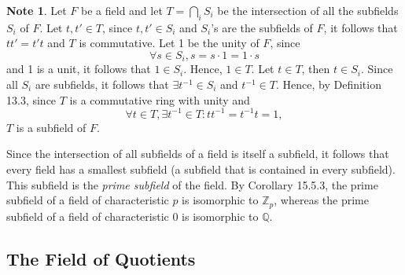 \documentclass{article}
\newtheorem{theorem}{Theorem}[section]
\theoremstyle{definition}
\newtheorem{note}{Note}[section]
\begin{document}
\begin{note}
    Let $F$ be a field and let $T=\bigcap_i S_i$ be the intersection of all the subfields $S_i$ of $F$. Let $t,t'\in T$, since $t,t'\in S_i$ and $S_i$'s are the subfields of $F$, it follows that $tt'=t't$ and $T$ is commutative. Let 1 be the unity of $F$, since
    \begin{equation*}
        \forall s \in S_i, s=s\cdot1=1\cdot s
    \end{equation*}
    and 1 is a unit, it follows that $1\in S_i$. Hence, $1\in T$. Let $t\in T$, then $t\in S_i$. Since all $S_i$ are subfields, it follows that $\exists t^{-1}\in S_i$ and $t^{-1}\in T$. Hence, by Definition 13.3, since $T$ is a commutative ring with unity and 
    \begin{equation*}
        \forall t \in T, \exists t^{-1}\in T: tt^{-1}=t^{-1}t=1,
    \end{equation*}
    $T$ is a subfield of $F$.
    
    Since the intersection of all subfields of a field is itself a subfield, it follows that every field has a smallest subfield (a subfield that is contained in every subfield). This subfield is the \textit{prime subfield} of the field. By Corollary 15.5.3, the prime subfield of a field of characteristic $p$ is isomorphic to $\mathbb{Z}_p$, whereas the prime subfield of a field of characteristic 0 is isomorphic to $\mathbb{Q}$. 
\end{note}

\subsection{The Field of Quotients}
\end{document}
